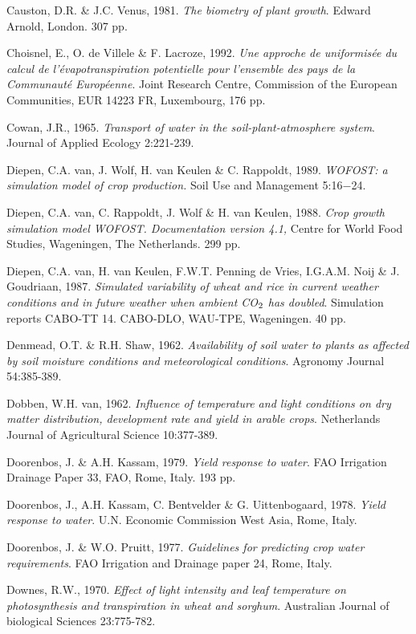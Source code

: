 Causton, D.R. \& J.C. Venus, 1981. {\it The biometry of plant growth\/}. Edward Arnold, London.
307 pp.

Choisnel, E., O. de Villele \& F. Lacroze, 1992. {\it Une approche de uniformis\'{e}e du calcul de
l'\'{e}vapotranspiration potentielle pour l'ensemble des pays de la Communaut\'{e} Europ\'{e}enne\/}.
Joint Research Centre, Commission of the European Communities, EUR 14223 FR,
Luxembourg, 176 pp.

Cowan, J.R., 1965. {\it Transport of water in the soil-plant-atmosphere system\/}. Journal of
Applied Ecology 2:221-239.

Diepen, C.A. van, J. Wolf, H. van Keulen \& C. Rappoldt, 1989. {\it WOFOST: a simulation
model of crop production.\/} Soil Use and Management 5:16$-$24. 

Diepen, C.A. van, C. Rappoldt, J. Wolf \& H. van Keulen, 1988. {\it Crop growth simulation
model WOFOST. Documentation version 4.1,\/} Centre for World Food Studies, Wageningen,
The Netherlands. 299 pp. 

Diepen, C.A. van, H. van Keulen, F.W.T. Penning de Vries, I.G.A.M. Noij \& J.
Goudriaan, 1987. {\it Simulated variabil\-ity of wheat and rice in current weather conditions and
in future weather when ambient CO$_{{\rm 2}}$ has doubled\/}. Simulation reports CABO-TT 14. CABO-DLO, WAU-TPE, Wageningen. 40 pp.

Denmead, O.T. \& R.H. Shaw, 1962. {\it Availability of soil water to plants as affected by soil
moisture conditions and meteorological conditions\/}. Agronomy Journal 54:385-389.

Dobben, W.H. van, 1962. {\it Influence of temperature and light conditions on dry matter
distribution, development rate and yield in arable crops\/}. Netherlands Journal of Agricultural
Science 10:377-389.

Doorenbos, J. \& A.H. Kassam, 1979. {\it Yield response to water\/}. FAO Irrigation Drainage
Paper 33, FAO, Rome, Italy. 193 pp.

Doorenbos, J., A.H. Kassam, C. Bentvelder \& G. Uittenbogaard, 1978. {\it Yield response to
water\/}. U.N. Economic Commission West Asia, Rome, Italy.

Doorenbos, J. \& W.O. Pruitt, 1977. {\it Guidelines for predicting crop water requirements\/}.
FAO Irrigation and Drainage paper 24, Rome, Italy.

Downes, R.W., 1970. {\it Effect of light intensity and leaf temperature on photosynthesis and
transpiration in wheat and sorghum\/}. Australian Journal of biological Sciences 23:775-782.

